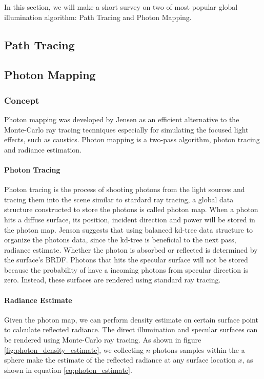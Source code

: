 In this section, we will make a short survey on two of most popular global illumination algorithm: Path Tracing and Photon Mapping. 

\subsection{Path Tracing}


\subsection{Photon Mapping}

\subsubsection{Concept} 

Photon mapping was developed by Jensen \cite{HenrikWannJensen2004} as an efficient alternative to the Monte-Carlo ray tracing tecnniques especially for simulating the focused light effects, such as caustics. Photon mapping is a two-pass algorithm, photon tracing and radiance estimation. 

\paragraph{Photon Tracing} 
Photon tracing is the process of shooting photons from the light sources and tracing them into the scene similar to stardard ray tracing, a global data structure constructed to store the photons is called photon map. When a photon hits a diffuse surface, its position, incident direction and power will be stored in the photon map. Jenson suggests that using balanced kd-tree data structure to organize the photons data, since the kd-tree is beneficial to the next pass, radiance estimate. Whether the photon is absorbed or reflected is determined by the surface's BRDF. Photons that hits the specular surface will not be stored because the probability of have a incoming photons from specular direction is zero. Instead, these surfaces are rendered using standard ray tracing. 

\paragraph{Radiance Estimate}
Given the photon map, we can perform density estimate on certain surface point to calculate reflected radiance. The direct illumination and specular surfaces can be rendered using Monte-Carlo ray tracing. As shown in figure \ref{fig:photon_density_estimate}, we collecting \(n\) photons samples within the a sphere make the estimate of the reflected radiance at any surface location \(x\), as shown in equation \ref{eq:photon_estimate}. 

